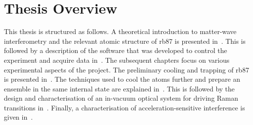 \section{Thesis Overview}
This thesis is structured as follows. A theoretical introduction to
matter-wave interferometry and the relevant atomic structure of
\ac{rb87} is presented in~. This is followed
by a description of the software that was developed to control the experiment and
acquire data in~. The subsequent chapters
focus on various experimental aspects of the project. The preliminary
cooling and trapping of \ac{rb87} is presented
in~. The techniques used to cool the atoms
further and prepare an ensemble in the same internal state are
explained in~. This is followed by the
design and characterisation of an in-vacuum optical system for driving
Raman transitions in~. Finally, a
characterisation of acceleration-sensitive interference is given
in~.



